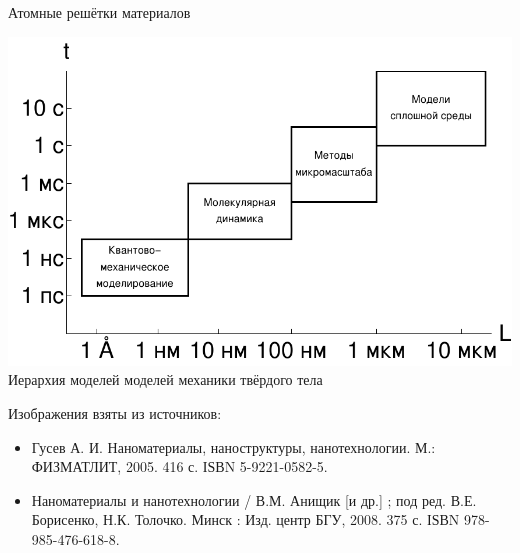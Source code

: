 \begin{frame}
\begin{minipage}{0.29\textwidth}
		Атомные решётки материалов
	\end{minipage}
	\hfill
	\begin{minipage}{0.69\textwidth}
		\begin{center}
		\includegraphics[width=\textwidth]{pics/ModelsHierarchy.pdf} \\
		Иерархия моделей моделей механики твёрдого тела
		\end{center}
	\end{minipage}
	
	\bigskip	
	
	Изображения взяты из источников:
\begin{itemize}
	\justifying
	\item Гусев А. И. Наноматериалы, наноструктуры, нанотехнологии. М.: ФИЗМАТЛИТ, 2005. 416 с. ІЅВN 5-9221-0582-5.
	\item Наноматериалы и нанотехнологии / В.М. Анищик [и др.] ; под ред. В.Е. Борисенко, Н.К. Толочко. Минск : Изд. центр БГУ, 2008. 375 с. ІЅВN 978-985-476-618-8.
\end{itemize}
\end{frame}

